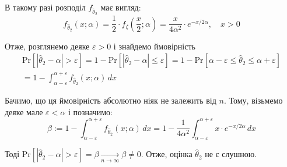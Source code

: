 \documentclass{hw_template}
\begin{document}
В такому разі розподіл $f_{\hat{\theta}_2}$ має вигляд:
\begin{equation*}
    f_{\hat{\theta}_2}(x;\alpha) = \frac{1}{2} \cdot f_{\zeta}\left(\frac{x}{2};\alpha\right) = \frac{x}{4\alpha^2} \cdot e^{-x/2\alpha}, \quad x > 0
\end{equation*}

Отже, розглянемо деяке $\varepsilon > 0$ і знайдемо ймовірність
\begin{align*}
    \text{Pr}[|\hat{\theta}_2 - \alpha| > \varepsilon] = 1 - \text{Pr}[|\hat{\theta}_2 - \alpha| \leq \varepsilon] = 1 - \text{Pr}[\alpha - \varepsilon \leq \hat{\theta}_2 \leq \alpha + \varepsilon] \\
    = 1 - \int_{\alpha - \varepsilon}^{\alpha + \varepsilon} f_{\hat{\theta}_2}(x;\alpha) \, dx
\end{align*}

Бачимо, що ця ймовірність абсолютно ніяк не залежить від $n$. Тому, візьмемо деяке мале $\varepsilon < \alpha$ і позначимо:
\begin{equation*}
    \beta := 1 - \int_{\alpha - \varepsilon}^{\alpha + \varepsilon} f_{\hat{\theta}_2}(x;\alpha) \, dx = 1 - \frac{1}{4\alpha^2}\int_{\alpha - \varepsilon}^{\alpha + \varepsilon} x \cdot e^{-x/2\alpha} \, dx
\end{equation*}

Тоді $\text{Pr}[|\hat{\theta}_2 - \alpha| > \varepsilon] = \beta \xrightarrow[n \to \infty]{} \beta \neq 0$. Отже, оцінка $\hat{\theta}_2$ не є слушною.
\end{document}
